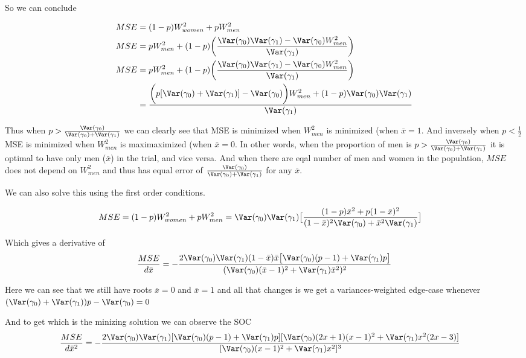 So we can conclude

\begin{align*}
	MSE &= (1 - p) W^2_{women} + p W^2_{men} \\
	MSE &= p W^{2}_{men} + (1-p) \bigg(\frac{\Var(\gamma_0) \Var(\gamma_1) - \Var(\gamma_0) W^{2}_{men}}{\Var(\gamma_1)} \bigg) \\
	MSE &= p W^{2}_{men} + (1-p) \bigg(\frac{\Var(\gamma_0) \Var(\gamma_1) - \Var(\gamma_0) W^{2}_{men}}{\Var(\gamma_1)} \bigg) \\
	&= \frac{\bigg(p[\Var(\gamma_0) + \Var(\gamma_1)]- \Var(\gamma_0)\bigg) W^{2}_{men} + (1-p) \Var(\gamma_0) \Var(\gamma_1)}{\Var(\gamma_1)}
\end{align*} 

Thus when $p > \frac{\Var(\gamma_0)}{\Var(\gamma_0) + \Var(\gamma_1)}$ we can clearly see that MSE is minimized when $W_{men}^2$ is minimized (when $\bar{x} = 1$. And inversely when $p < \frac{1}{2}$ MSE is minimized when $W_{men}^2$ is maximaximized (when $\bar{x} = 0$.
In other words, when the proportion of men is  $p > \frac{\Var(\gamma_0)}{\Var(\gamma_0) + \Var(\gamma_1)}$ it is optimal to have only men ($\bar{x}$) in the trial, and vice versa. And when there are eqal number of men and women in the population,  $MSE$ does not depend on $W_{men}^2$ and thus has equal error of $\frac{\Var(\gamma_0)}{\Var(\gamma_0) + \Var(\gamma_1)}$ for any $\bar{x}$.

We can also solve this using the first order conditions.

\begin{align*}
	MSE = (1-p)W_{women}^2 + p W_{men}^2 &= \Var(\gamma_0) \Var(\gamma_1) \big[ \frac{(1-p)\bar{x}^2 + p(1- \bar{x})^2}{(1-\bar{x})^2 \Var(\gamma_0) + \bar{x}^2 \Var(\gamma_1)} \big]
\end{align*} 

Which gives a derivative of
\begin{align*}
	\frac{MSE}{d\bar{x}} = -\frac{ 2 \Var(\gamma_0) \Var(\gamma_1) (1 - \bar{x}) \bar{x} \big[\Var(\gamma_0) (p - 1) + \Var(\gamma_1) p\big] }{(\Var(\gamma_0) (\bar{x} - 1)^2 + \Var(\gamma_1) \bar{x}^2)^2}
\end{align*} 

Here we can see that we still have roots $\bar{x} = 0$ and $\bar{x} = 1$ and all that changes is we get a variances-weighted edge-case whenever $(\Var(\gamma_0) + \Var(\gamma_1))p - \Var(\gamma_0) = 0$

And to get which is the minizing solution we can observe the SOC 
\begin{align*}
	\frac{MSE}{d \bar{x}^2} &= -\frac{2 \Var(\gamma_0) \Var(\gamma_1) [ \Var(\gamma_0) (p - 1) + \Var(\gamma_1) p ] [ \Var(\gamma_0) (2 x + 1) (x - 1)^2 + \Var(\gamma_1) x^2 (2 x - 3) ]}{[ \Var(\gamma_0) (x - 1)^2 + \Var(\gamma_1) x^2 ]^3}
\end{align*} 

